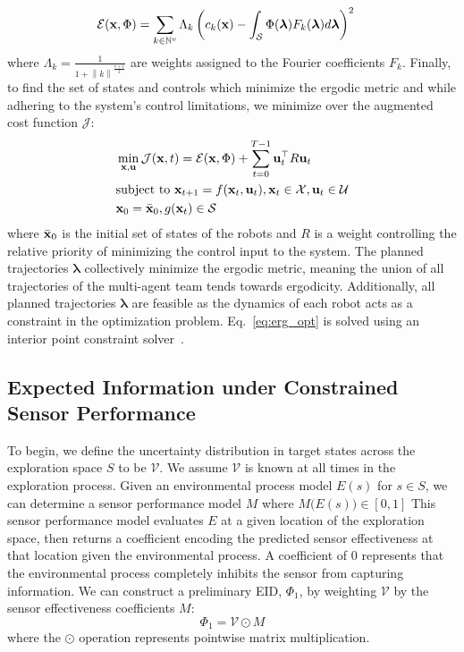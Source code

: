 \documentclass[letterpaper, 10 pt, conference]{ieeeconf}  %
\newcommand{\norm}[1]{\left\lVert#1\right\rVert}
\begin{document}
\begin{align}
    &\mathcal{E}(\bold{x}, \Phi) = \sum_{k\in \mathbb{N}^v} \Lambda_k \left( c_k(\bold{x}) - \int_{\mathcal{S}} \Phi(\boldsymbol{\lambda}) F_k(\boldsymbol{\lambda})d\boldsymbol{\lambda} \right)^2
\end{align}
where $\Lambda_k=\frac{1}{1+\norm{k}^{\frac{v+1}{2}}}$ are weights assigned to the Fourier coefficients $F_k$. Finally, to find the set of states and controls which minimize the ergodic metric and while adhering to the system's control limitations, we minimize over the augmented cost function $\mathcal{J}$:
\begin{align} \label{eq:erg_opt}
    & \min_{\mathbf{x}, \mathbf{u}}\mathcal{J}(\bold{x}, t)= \mathcal{E}(\bold{x}, \Phi) + \sum_{t=0}^{T-1} \bold{u}_t^\top R \bold{u}_t \\ 
    &\text{subject to } \bold{x}_{t+1} = f(\bold{x}_t, \bold{u}_t), \bold{x}_t \in \mathcal{X}, \bold{u}_t \in \mathcal{U} \nonumber \\ 
    & \bold{x}_0 = \bar{\bold{x}}_0, g(\bold{x}_t) \in \mathcal{S}  \nonumber
\end{align}
where $\bar{\bold{x}}_0$ is the initial set of states of the robots and $R$ is a weight controlling the relative priority of minimizing the control input to the system. The planned trajectories $\boldsymbol{\lambda}$ collectively minimize the ergodic metric, meaning the union of all trajectories of the multi-agent team tends towards ergodicity. Additionally, all planned trajectories $\boldsymbol{\lambda}$ are feasible as the dynamics of each robot acts as a constraint in the optimization problem. Eq.~\eqref{eq:erg_opt} is solved using an interior point constraint solver~\cite{boyd2004convex,lukvsan2004interior}.

\subsection{Expected Information under Constrained Sensor Performance}
To begin, we define the uncertainty distribution in target states across the exploration space $S$ to be $\mathcal{V}$. We assume $\mathcal{V}$ is known at all times in the exploration process. Given an environmental process model $E(s)$ for $s \in S$, we can determine a sensor performance model $M$ where $M\big(E(s)\big) \in [0, 1]$ This sensor performance model evaluates $E$ at a given location of the exploration space, then returns a coefficient encoding the predicted sensor effectiveness at that location given the environmental process. A coefficient of 0 represents that the environmental process completely inhibits the sensor from capturing information. We can construct a preliminary EID, $\Phi_{ 1}$, by weighting $\mathcal{V}$ by the sensor effectiveness coefficients $M$:
\begin{equation}
    \Phi_{1} = \mathcal{V} \odot M
\end{equation}
where the $\odot$ operation represents pointwise matrix multiplication. 
\end{document}

